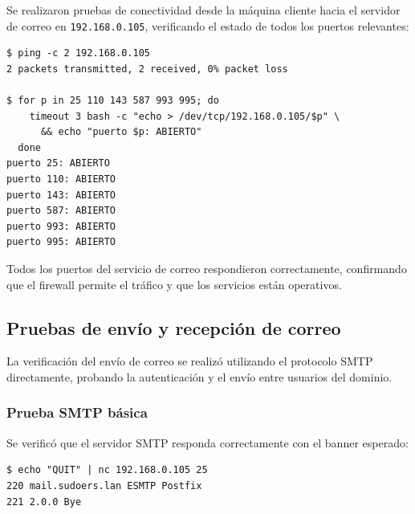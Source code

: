 Se realizaron pruebas de conectividad desde la máquina cliente hacia el
servidor de correo en \texttt{192.168.0.105}, verificando el estado de
todos los puertos relevantes:

\begin{lstlisting}[style=terminal]
$ ping -c 2 192.168.0.105
2 packets transmitted, 2 received, 0% packet loss

$ for p in 25 110 143 587 993 995; do
    timeout 3 bash -c "echo > /dev/tcp/192.168.0.105/$p" \
      && echo "puerto $p: ABIERTO"
  done
puerto 25: ABIERTO
puerto 110: ABIERTO
puerto 143: ABIERTO
puerto 587: ABIERTO
puerto 993: ABIERTO
puerto 995: ABIERTO
\end{lstlisting}

Todos los puertos del servicio de correo respondieron correctamente,
confirmando que el firewall permite el tráfico y que los servicios
están operativos.


\subsection{Pruebas de envío y recepción de correo}

La verificación del envío de correo se realizó utilizando el protocolo SMTP
directamente, probando la autenticación y el envío entre usuarios del dominio.

\subsubsection{Prueba SMTP básica}

Se verificó que el servidor SMTP responda correctamente con el banner
esperado:

\begin{lstlisting}[style=terminal]
$ echo "QUIT" | nc 192.168.0.105 25
220 mail.sudoers.lan ESMTP Postfix
221 2.0.0 Bye
\end{lstlisting}


